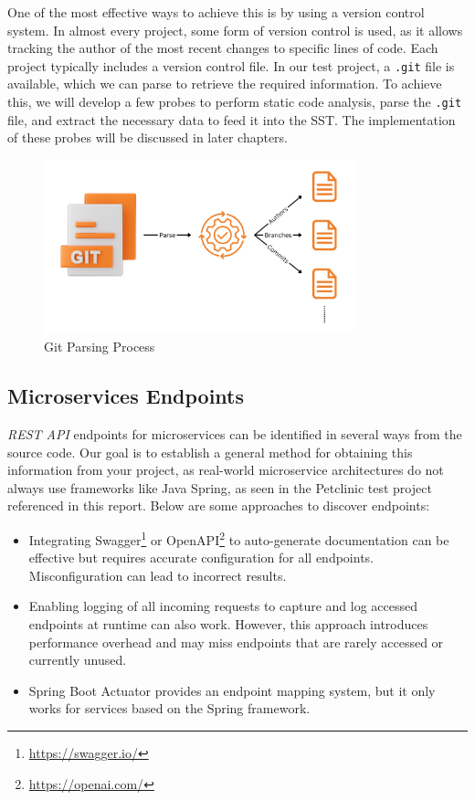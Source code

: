 One of the most effective ways to achieve this is by using a version control system. In almost every project, some form of version control is used, as it allows tracking the author of the most recent changes to specific lines of code. Each project typically includes a version control file. In our test project, a \texttt{.git} file is available, which we can parse to retrieve the required information. To achieve this, we will develop a few probes to perform static code analysis, parse the \texttt{.git} file, and extract the necessary data to feed it into the SST. The implementation of these probes will be discussed in later chapters.

\begin{figure}[H]
    \centering
    \includegraphics[width=0.8\textwidth]{figures/parse_git_file.png}
    \caption{Git Parsing Process}
    \label{fig_parse_git_file}
\end{figure}

\subsection{Microservices Endpoints}

\textit{REST API} endpoints for microservices can be identified in several ways from the source code. Our goal is to establish a general method for obtaining this information from your project, as real-world microservice architectures do not always use frameworks like Java Spring, as seen in the Petclinic test project referenced in this report. Below are some approaches to discover endpoints:

\begin{itemize}
    \item Integrating Swagger\footnote{\url{https://swagger.io/}} or OpenAPI\footnote{\url{https://openai.com/}} to auto-generate documentation can be effective but requires accurate configuration for all endpoints. Misconfiguration can lead to incorrect results.
    \item Enabling logging of all incoming requests to capture and log accessed endpoints at runtime can also work. However, this approach introduces performance overhead and may miss endpoints that are rarely accessed or currently unused.
    \item Spring Boot Actuator provides an endpoint mapping system, but it only works for services based on the Spring framework.
\end{itemize}

